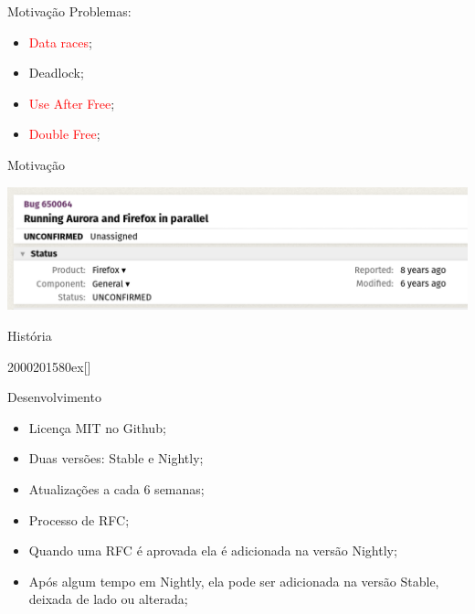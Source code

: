 \documentclass[aspectratio=169]{beamer}
\begin{document}
\begin{frame}{Motivação}
Problemas:
\begin{itemize}
	\item \textcolor{red}{Data races};
	\item Deadlock;
	\item \textcolor{red}{Use After Free};
	\item \textcolor{red}{Double Free};
\end{itemize}
\end{frame}

\begin{frame}{Motivação}
	\begin{center}
		\includegraphics[width=13.5cm]{imgs/bug.png}
	\end{center}
\end{frame}

\begin{frame}{História}
	\begin{chronology}[5]{2000}{2015}{80ex}[\textwidth]
	\end{chronology}
\end{frame}

\begin{frame}{Desenvolvimento}
	\begin{itemize}
		\item Licença MIT no Github;
		\item Duas versões: Stable e Nightly;
		\item Atualizações a cada 6 semanas;
		\item Processo de RFC;
		\item Quando uma RFC é aprovada ela é adicionada na versão Nightly;
		\item Após algum tempo em Nightly, ela pode ser adicionada na versão Stable, deixada de lado ou alterada;	
	\end{itemize}
\end{frame}
\end{document}
